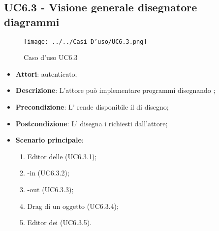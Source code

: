 \subsection{UC6.3 - Visione generale  disegnatore diagrammi}
\label{ssec:UC6.3}
\begin{figure}[h!]
\centering
\texttt{[image: ../../Casi D'uso/UC6.3.png]}
\caption{Caso d'uso UC6.3}
 \end{figure}
\begin{itemize}
\item \textbf{Attori}:  autenticato;
\item \textbf{Descrizione}: L'attore può implementare programmi disegnando ;
\item \textbf{Precondizione}: L' rende disponibile il  di disegno;
\item \textbf{Postcondizione}: L' disegna i  richiesti dall'attore;
\item \textbf{Scenario principale}: \begin{enumerate}\item Editor  delle  (UC6.3.1);\item {}-in (UC6.3.2);\item {}-out (UC6.3.3);\item Drag di un oggetto (UC6.3.4);\item Editor  dei  (UC6.3.5).
 \end{enumerate}
\end{itemize}
\newpage
